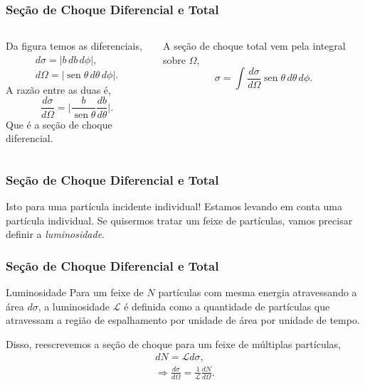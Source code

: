 \documentclass[xcolor=dvipsnames]{beamer}
\DeclareMathOperator*{\sen}{sen}
\begin{document}
\begin{frame}
	\frametitle{Seção de Choque Diferencial e Total}
	\begin{columns}
		Da figura temos as diferenciais,
		\begin{gather}
			d\sigma = |b\, db\, d\phi|,\\
			d\Omega = |\sen \theta \, d\theta \, d\phi|.
		\end{gather}
		A razão entre as duas é,
		\begin{equation}
			\frac{d\sigma}{d\Omega} = \bigg| \frac{b}{\sen \theta}
			\frac{db}{d\theta} \bigg|. \label{diff_cross_section}
		\end{equation}
		Que é a seção de choque diferencial.

		A seção de choque total vem pela integral sobre $\Omega$,
		\begin{equation}
			\sigma = \int \frac{d\sigma}{d\Omega} \sen \theta \, d\theta \, d\phi .
		\end{equation}
	\end{columns}
\end{frame}

\begin{frame}
	\frametitle{Seção de Choque Diferencial e Total}
	\begin{block}{Isto para uma partícula incidente individual!}
		Estamos levando em conta uma partícula individual. Se quisermos tratar
		um feixe de partículas, vamos precisar definir a \textit{luminosidade}.
	\end{block}

\end{frame}

\begin{frame}
	\frametitle{Seção de Choque Diferencial e Total}
	\begin{block}{Luminosidade}
		Para um feixe de $N$ partículas com mesma energia atravessando a área
		$d\sigma$, a luminosidade $\mathcal{L}$ é definida como a quantidade
		de partículas que atravessam a região de espalhamento por unidade de
		área por unidade de tempo.
	\end{block}
	Disso, reescrevemos a seção de choque para um feixe de múltiplas partículas,
	\begin{gather}
		dN = \mathcal{L} d\sigma, \\
		\Rightarrow \frac{d\sigma}{d\Omega} = \frac{1}{\mathcal{L}}
		\frac{dN}{d\Omega}.
	\end{gather}
\end{frame}
\end{document}
